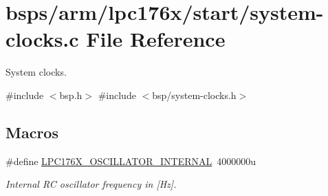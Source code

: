 \hypertarget{lpc176x_2start_2system-clocks_8c}{}\section{bsps/arm/lpc176x/start/system-\/clocks.c File Reference}
\label{lpc176x_2start_2system-clocks_8c}


System clocks.  


{\ttfamily \#include $<$bsp.\+h$>$}\newline
{\ttfamily \#include $<$bsp/system-\/clocks.\+h$>$}\newline
\subsection*{Macros}
\begin{DoxyCompactItemize}
\item 
\mbox{\label{lpc176x_2start_2system-clocks_8c_aa9fed453f7a18eff2eafd97142584f67}} 
\#define \mbox{\hyperlink{lpc176x_2start_2system-clocks_8c_aa9fed453f7a18eff2eafd97142584f67}{L\+P\+C176\+X\+\_\+\+O\+S\+C\+I\+L\+L\+A\+T\+O\+R\+\_\+\+I\+N\+T\+E\+R\+N\+AL}}~4000000u
\begin{DoxyCompactList}\small\item\em Internal RC oscillator frequency in \mbox{[}Hz\mbox{]}. \end{DoxyCompactList}\end{DoxyCompactItemize}
